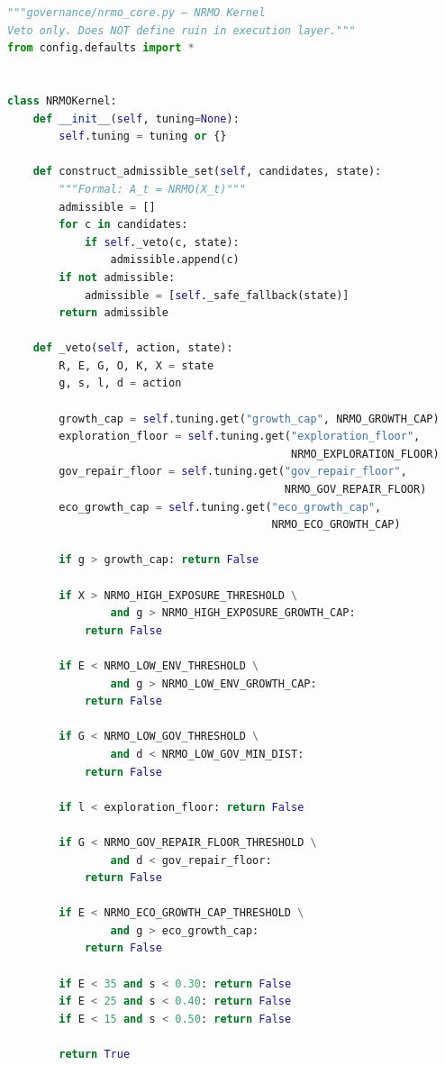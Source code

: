 \begin{lstlisting}[language=Python,basicstyle=\ttfamily\scriptsize,frame=single]
"""governance/nrmo_core.py — NRMO Kernel
Veto only. Does NOT define ruin in execution layer."""
from config.defaults import *


class NRMOKernel:
    def __init__(self, tuning=None):
        self.tuning = tuning or {}

    def construct_admissible_set(self, candidates, state):
        """Formal: A_t = NRMO(X_t)"""
        admissible = []
        for c in candidates:
            if self._veto(c, state):
                admissible.append(c)
        if not admissible:
            admissible = [self._safe_fallback(state)]
        return admissible

    def _veto(self, action, state):
        R, E, G, O, K, X = state
        g, s, l, d = action

        growth_cap = self.tuning.get("growth_cap", NRMO_GROWTH_CAP)
        exploration_floor = self.tuning.get("exploration_floor",
                                            NRMO_EXPLORATION_FLOOR)
        gov_repair_floor = self.tuning.get("gov_repair_floor",
                                           NRMO_GOV_REPAIR_FLOOR)
        eco_growth_cap = self.tuning.get("eco_growth_cap",
                                         NRMO_ECO_GROWTH_CAP)

        if g > growth_cap: return False

        if X > NRMO_HIGH_EXPOSURE_THRESHOLD \
                and g > NRMO_HIGH_EXPOSURE_GROWTH_CAP:
            return False

        if E < NRMO_LOW_ENV_THRESHOLD \
                and g > NRMO_LOW_ENV_GROWTH_CAP:
            return False

        if G < NRMO_LOW_GOV_THRESHOLD \
                and d < NRMO_LOW_GOV_MIN_DIST:
            return False

        if l < exploration_floor: return False

        if G < NRMO_GOV_REPAIR_FLOOR_THRESHOLD \
                and d < gov_repair_floor:
            return False

        if E < NRMO_ECO_GROWTH_CAP_THRESHOLD \
                and g > eco_growth_cap:
            return False

        if E < 35 and s < 0.30: return False
        if E < 25 and s < 0.40: return False
        if E < 15 and s < 0.50: return False

        return True


\end{lstlisting}
